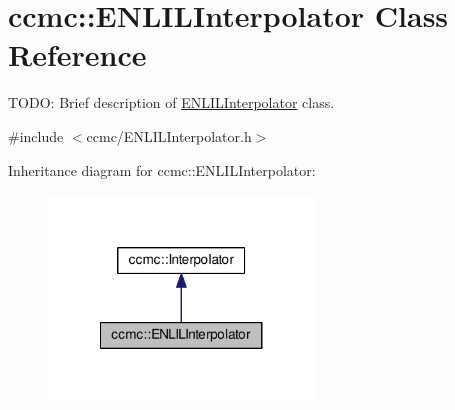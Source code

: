 \hypertarget{classccmc_1_1_e_n_l_i_l_interpolator}{\section{ccmc\-:\-:E\-N\-L\-I\-L\-Interpolator Class Reference}
\label{classccmc_1_1_e_n_l_i_l_interpolator}
}


T\-O\-D\-O\-: Brief description of \hyperlink{classccmc_1_1_e_n_l_i_l_interpolator}{E\-N\-L\-I\-L\-Interpolator} class.  




{\ttfamily \#include $<$ccmc/\-E\-N\-L\-I\-L\-Interpolator.\-h$>$}



Inheritance diagram for ccmc\-:\-:E\-N\-L\-I\-L\-Interpolator\-:
\nopagebreak
\begin{figure}[H]
\begin{center}
\leavevmode
\includegraphics[width=200pt]{classccmc_1_1_e_n_l_i_l_interpolator__inherit__graph}
\end{center}
\end{figure}


